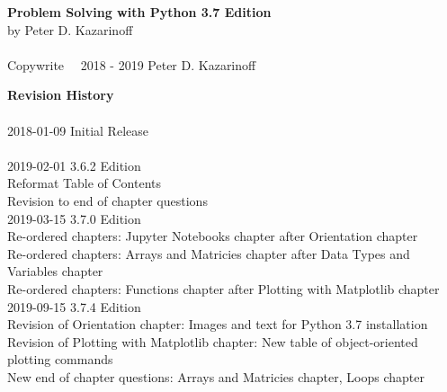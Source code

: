 
\textbf{Problem Solving with Python 3.7 Edition} \\
by Peter D. Kazarinoff \\
\\
Copywrite \  \textcopyright \  2018 - 2019 Peter D. Kazarinoff\\

\vspace{3in}

\textbf{Revision History}\\
\\
2018-01-09 Initial Release\\
\\
2019-02-01 3.6.2 Edition\\
Reformat Table of Contents\\
Revision to end of chapter questions\\

2019-03-15 3.7.0 Edition \\
Re-ordered chapters: Jupyter Notebooks chapter after Orientation chapter \\
Re-ordered chapters: Arrays and Matricies chapter after Data Types and Variables chapter \\
Re-ordered chapters: Functions chapter after Plotting with Matplotlib chapter \\

2019-09-15 3.7.4 Edition \\
Revision of Orientation chapter: Images and text for Python 3.7 installation \\
Revision of Plotting with Matplotlib chapter: New table of object-oriented plotting commands \\
New end of chapter questions: Arrays and Matricies chapter, Loops chapter \\
